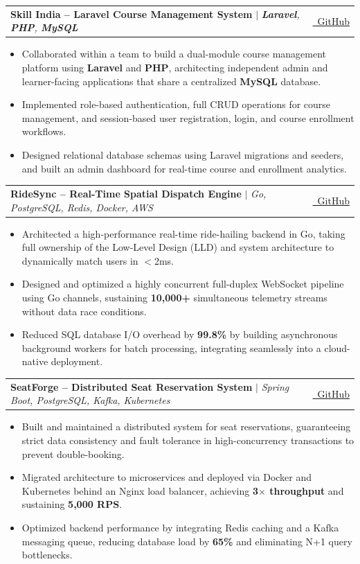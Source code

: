 \documentclass[letterpaper,11pt]{article}
\makeatletter
\newcommand{\resumeItem}[1]{
  \item\small{
    {#1 \vspace{-1pt}}
  }
}
\newcommand{\resumeProjectHeading}[2]{
    \item
    \begin{tabular*}{\textwidth}{l@{\extracolsep{\fill}}r}
      #1 & {\color{dark-grey}\small #2} \\
    \end{tabular*}\vspace{-4pt}
}
\newcommand{\resumeItemListStart}{\begin{itemize}}
\newcommand{\resumeItemListEnd}{\end{itemize}\vspace{0pt}}
\makeatother
\begin{document}
      \resumeProjectHeading
          {\textbf{Skill India -- Laravel Course Management System} $|$ \emph{\textbf{Laravel}, \textbf{PHP}, \textbf{MySQL}}}{\href{https://github.com/ASWINKMANOJ/Skill-India-Laravel}{\faGithub\ GitHub}}
          \resumeItemListStart
            \resumeItem{Collaborated within a team to build a dual-module course management platform using \textbf{Laravel} and \textbf{PHP}, architecting independent admin and learner-facing applications that share a centralized \textbf{MySQL} database.}
            \resumeItem{Implemented role-based authentication, full CRUD operations for course management, and session-based user registration, login, and course enrollment workflows.}
            \resumeItem{Designed relational database schemas using Laravel migrations and seeders, and built an admin dashboard for real-time course and enrollment analytics.}
          \resumeItemListEnd

      \resumeProjectHeading
          {\textbf{RideSync -- Real-Time Spatial Dispatch Engine} $|$ \emph{Go, PostgreSQL, Redis, Docker, AWS}}{\href{https://github.com/ASWINKMANOJ/RideSync}{\faGithub\ GitHub}}
          \resumeItemListStart
            \resumeItem{Architected a high-performance real-time ride-hailing backend in Go, taking full ownership of the Low-Level Design (LLD) and system architecture to dynamically match users in {$<$2ms}.}
            \resumeItem{Designed and optimized a highly concurrent full-duplex WebSocket pipeline using Go channels, sustaining \textbf{10,000+} simultaneous telemetry streams without data race conditions.}
            \resumeItem{Reduced SQL database I/O overhead by \textbf{99.8\%} by building asynchronous background workers for batch processing, integrating seamlessly into a cloud-native deployment.}
          \resumeItemListEnd

        \resumeProjectHeading
          {\textbf{SeatForge -- Distributed Seat Reservation System} $|$ \emph{Spring Boot, PostgreSQL, Kafka, Kubernetes}}{\href{https://github.com/ASWINKMANOJ/SeatForge}{\faGithub\ GitHub}}
          \resumeItemListStart
            \resumeItem{Built and maintained a distributed system for seat reservations, guaranteeing strict data consistency and fault tolerance in high-concurrency transactions to prevent double-booking.}
            \resumeItem{Migrated architecture to microservices and deployed via Docker and Kubernetes behind an Nginx load balancer, achieving \textbf{3$\times$ throughput} and sustaining \textbf{5,000 RPS}.}
            \resumeItem{Optimized backend performance by integrating Redis caching and a Kafka messaging queue, reducing database load by \textbf{65\%} and eliminating N+1 query bottlenecks.}
          \resumeItemListEnd
\end{document}
